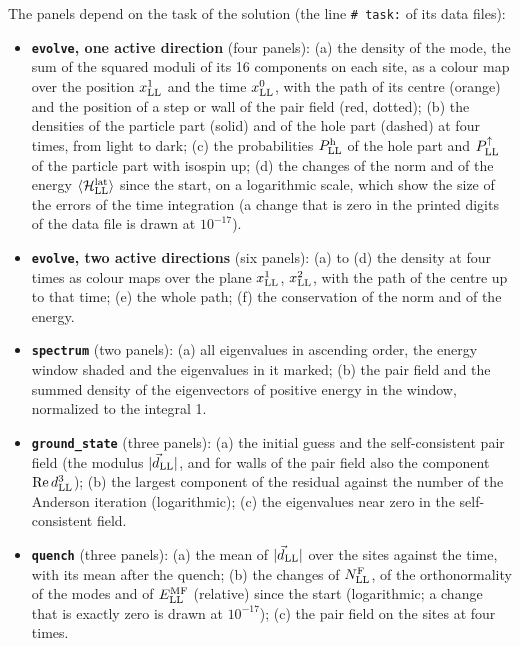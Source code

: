 \documentclass[
  10pt,
]{article}
\providecommand{\tightlist}{%
  \setlength{\itemsep}{0pt}\setlength{\parskip}{0pt}}
\begin{document}
The panels depend on the task of the solution (the line
\texttt{\#\ task:} of its data files):

\begin{itemize}
\tightlist
\item
  \textbf{\texttt{evolve}, one active direction} (four panels): (a) the
  density of the mode, the sum of the squared moduli of its 16
  components on each site, as a colour map over the position
  \(x^1_{\rm LL}\) and the time \(x^0_{\rm LL}\), with the path of its
  centre (orange) and the position of a step or wall of the pair field
  (red, dotted); (b) the densities of the particle part (solid) and of
  the hole part (dashed) at four times, from light to dark; (c) the
  probabilities \(P^{\rm h}_{\rm LL}\) of the hole part and
  \(P^\uparrow_{\rm LL}\) of the particle part with isospin up; (d) the
  changes of the norm and of the energy
  \(\langle\mathcal H^{\rm lat}_{\rm LL}\rangle\) since the start, on a
  logarithmic scale, which show the size of the errors of the time
  integration (a change that is zero in the printed digits of the data
  file is drawn at \(10^{-17}\)).
\item
  \textbf{\texttt{evolve}, two active directions} (six panels): (a) to
  (d) the density at four times as colour maps over the plane
  \(x^1_{\rm LL}\), \(x^2_{\rm LL}\), with the path of the centre up to
  that time; (e) the whole path; (f) the conservation of the norm and of
  the energy.
\item
  \textbf{\texttt{spectrum}} (two panels): (a) all eigenvalues in
  ascending order, the energy window shaded and the eigenvalues in it
  marked; (b) the pair field and the summed density of the eigenvectors
  of positive energy in the window, normalized to the integral 1.
\item
  \textbf{\texttt{ground\_state}} (three panels): (a) the initial guess
  and the self-consistent pair field (the modulus
  \(\lvert\vec d_{\rm LL}\rvert\), and for walls of the pair field also
  the component \(\mathrm{Re}\,d^3_{\rm LL}\)); (b) the largest
  component of the residual against the number of the Anderson iteration
  (logarithmic); (c) the eigenvalues near zero in the self-consistent
  field.
\item
  \textbf{\texttt{quench}} (three panels): (a) the mean of
  \(\lvert\vec d_{\rm LL}\rvert\) over the sites against the time, with
  its mean after the quench; (b) the changes of \(N^{\rm F}_{\rm LL}\),
  of the orthonormality of the modes and of \(E^{\rm MF}_{\rm LL}\)
  (relative) since the start (logarithmic; a change that is exactly zero
  is drawn at \(10^{-17}\)); (c) the pair field on the sites at four
  times.
\end{itemize}
\end{document}
